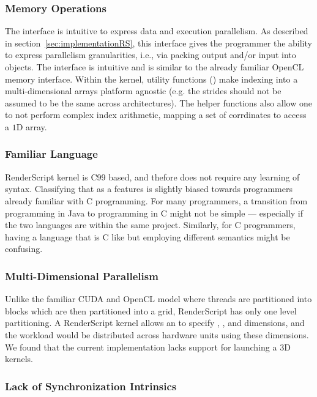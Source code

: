 \subsubsection{Memory Operations}

The  interface is intuitive to express data and
execution parallelism. As described in section~\ref{sec:implementationRS}, this
 interface gives the programmer the ability to express parallelism
granularities, i.e., via packing output and/or input into  objects.
The interface is intuitive and is similar to the already familiar OpenCL memory interface.
Within the kernel, utility functions () make indexing
 into a multi-dimensional arrays platform agnostic
 (e.g. the strides should not be assumed to be the same across architectures).
The helper functions also allow one to not perform complex index arithmetic, mapping
 a set of corrdinates to access a $1$D array.


\subsubsection{Familiar Language}

RenderScript kernel is C99 based, and thefore does not require any learning of syntax.
Classifying that as a features is slightly biased towards programmers already familiar with
 C programming.
For many programmers, a transition from programming in Java to programming in C might not be simple
 --- especially if the two languages are within the same project.
Similarly, for C programmers, having a language that is C like but employing different semantics
  might be confusing.


\subsubsection{Multi-Dimensional Parallelism}


Unlike the familiar CUDA and OpenCL model where threads are partitioned into blocks which are
  then partitioned into a grid, RenderScript has only one level partitioning.
A RenderScript kernel allows an  to specify , , and 
dimensions, and the workload would be distributed across hardware units using
these dimensions.
We found that the current implementation lacks support for launching a $3$D kernels.

\subsubsection{Lack of Synchronization Intrinsics}

